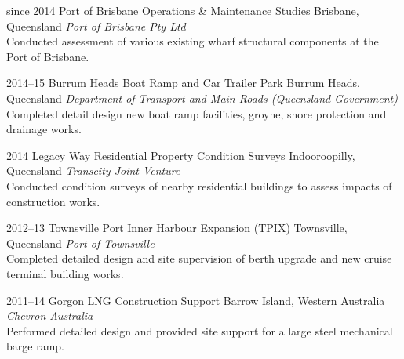 \documentclass[print]{friggeri}
\begin{document}
\begin{entrylist}
\entry%
{since 2014}
{Port of Brisbane Operations \& Maintenance Studies}
{Brisbane, Queensland}
{\emph{Port of Brisbane Pty Ltd} \\
Conducted assessment of various existing wharf structural components at the Port of Brisbane.}
\end{entrylist}

\begin{entrylist}
\entry%
{2014--15}
{Burrum Heads Boat Ramp and Car Trailer Park}
{Burrum Heads, Queensland}
{\emph{Department of Transport and Main Roads (Queensland Government)} \\
Completed detail design new boat ramp facilities, groyne, shore protection and drainage works.}
\end{entrylist}

\begin{entrylist}
\entry%
{2014}
{Legacy Way Residential Property Condition Surveys}
{Indooroopilly, Queensland}
{\emph{Transcity Joint Venture} \\
Conducted condition surveys of nearby residential buildings to assess impacts of construction works.}
\end{entrylist}


\begin{entrylist}
\entry%
{2012--13}
{Townsville Port Inner Harbour Expansion (TPIX)}
{Townsville, Queensland}
{\emph{Port of Townsville} \\
Completed detailed design and site supervision of berth upgrade and new cruise terminal building works.}
\end{entrylist}


\begin{entrylist}
\entry%
{2011--14}
{Gorgon LNG Construction Support}
{Barrow Island, Western Australia}
{\emph{Chevron Australia} \\
Performed detailed design and provided site support for a large steel mechanical barge ramp.}
\end{entrylist}

\end{document}
